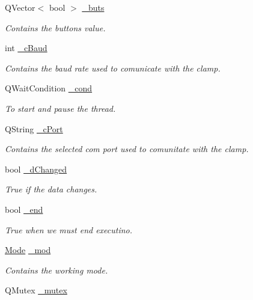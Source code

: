 \begin{DoxyCompactItemize}
Q\+Vector$<$ bool $>$ \hyperlink{class_servo_thread_a6f956f7e0f2953e213ff95fb64857ab0}{\+\_\+buts}
\begin{DoxyCompactList}\small\item\em Contains the buttons value. \end{DoxyCompactList}\item 
int \hyperlink{class_servo_thread_a9fccfd415e2e55c8abef7fcc6535af30}{\+\_\+c\+Baud}
\begin{DoxyCompactList}\small\item\em Contains the baud rate used to comunicate with the clamp. \end{DoxyCompactList}\item 
Q\+Wait\+Condition \hyperlink{class_servo_thread_afcb93c09acd7fecf47d92996a297365c}{\+\_\+cond}
\begin{DoxyCompactList}\small\item\em To start and pause the thread. \end{DoxyCompactList}\item 
Q\+String \hyperlink{class_servo_thread_ab52437b31a433c427a6c050f2b1cc959}{\+\_\+c\+Port}
\begin{DoxyCompactList}\small\item\em Contains the selected com port used to comunitate with the clamp. \end{DoxyCompactList}\item 
bool \hyperlink{class_servo_thread_a2b6ccfeacbb3cc9ac5c34549b9aa3f11}{\+\_\+d\+Changed}
\begin{DoxyCompactList}\small\item\em True if the data changes. \end{DoxyCompactList}\item 
bool \hyperlink{class_servo_thread_acca9896d1a2d1ef68527e6834f81c76c}{\+\_\+end}
\begin{DoxyCompactList}\small\item\em True when we must end executino. \end{DoxyCompactList}\item 
\hyperlink{class_servo_thread_a8d581034e60792a9995d44065f6140a5}{Mode} \hyperlink{class_servo_thread_acdecea1688594d3ab7386a6db97dd90d}{\+\_\+mod}
\begin{DoxyCompactList}\small\item\em Contains the working mode. \end{DoxyCompactList}\item 
Q\+Mutex \hyperlink{class_servo_thread_a6327eafc0dac189ec1b202d63ef32457}{\+\_\+mutex}

\end{DoxyCompactItemize}
